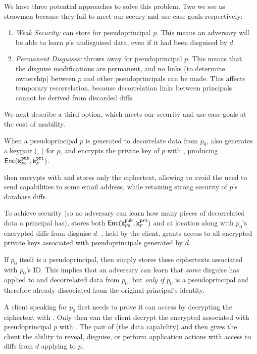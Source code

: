 We have three potential approaches to solve this problem. Two we see as strawmen because they fail
to meet our secury and use case goals respectively:
\begin{enumerate}
    \item \emph{Weak Security:} \sys can store  for pseudoprincipal $p$. This means
        an adversary will be able to learn $p$'s undisguised data, even if it had been disguised by
        $d$.

    \item \emph{Permanent Disguises:} \sys throws away  for pseudoprincipal $p$. This means that the
        disguise modifications are permanent, and no links (to determine ownership) between
        $p$ and other pseudoprincipals can be made. This affects temporary recorrelation, because
        decorrelation links between principals cannot be derived from discarded diffs.
\end{enumerate}

We next describe a third option, which meets our security and use
case goals at the cost of usability.

When a pseudoprincipal $p$ is generated to decorrelate data from $p_0$, \sys also generates a
keypair (, ) for $p$, and encrypts the private key of $p$ with ,
producing $\mathsf{Enc}(\texttt{\ensuremath{\texttt{k}^{\text{pub}}_{p_0}}}, \texttt{\ensuremath{\texttt{k}^{\text{pri}}_{p}}})$.

\sys then encrypts  with  and stores only the ciphertext, allowing \sys to avoid
the need to send capabilities to some email address, while retaining strong security of $p$'s
database diffs. 

To achieve security (so no adversary can learn how many pieces of decorrelated data a principal
has), \sys stores both $\mathsf{Enc}(\texttt{\ensuremath{\texttt{k}^{\text{pub}}_{p_0}}}, \texttt{\ensuremath{\texttt{k}^{\text{pri}}_{p}}})$ and  at location 
along with $p_0$'s encrypted diffs from disguise $d$. , held by the client, grants
access to all encrypted private keys associated with pseudoprincipals generated by $d$.

If $p_0$ itself is a pseudoprincipal, then \sys simply stores these ciphertexts associated with
$p_0$'s ID.  This implies that an adversary can learn that \emph{some} disguise has applied to and
decorrelated data from $p_0$, but \emph{only if} $p_0$ is a pseudoprincipal and therefore already
dissociated from the original principal's identity.  

A client speaking for $p_0$ first needs to prove it can access  by decrypting the 
ciphertext with . Only then can the client decrypt the encrypted  associated
with pseudoprincipal $p$ with . The pair of  (the data capability) and 
then gives the client the ability to reveal, disguise, or perform application actions with access to
diffs from $d$ applying to $p$.

